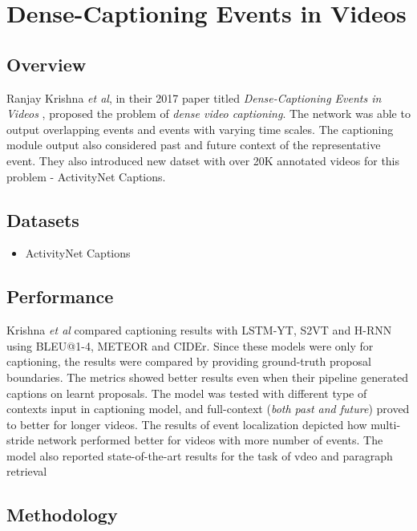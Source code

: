 \section{Dense-Captioning Events in Videos}

\subsection{Overview}

\par Ranjay Krishna \textit{et al}, in their 2017 paper titled \textit{Dense-Captioning Events in Videos} \cite{krishna2017densecaptioning}, proposed the problem of \textit{dense video captioning}. The network was able to output overlapping events and events with varying time scales. The captioning module output also considered past and future context of the representative event. They also introduced new datset with over 20K annotated videos for this problem - ActivityNet Captions.


\subsection{Datasets}
\begin{itemize}
\item ActivityNet Captions
\end{itemize}

\subsection{Performance}
\par Krishna \textit{et al} compared captioning results with LSTM-YT\cite{venugopalan2015sequence}, S2VT\cite{venugopalan2015translating} and H-RNN\cite{yu2016video} using BLEU@1-4, METEOR and CIDEr. Since these models were only for captioning, the results were compared by providing ground-truth proposal boundaries. The metrics showed better results even when their pipeline generated captions on learnt proposals. The model was tested with different type of contexts input in captioning model, and full-context (\textit{both past and future}) proved to better for longer videos. The results of event localization depicted how multi-stride network performed better for videos with more number of events. The model also reported state-of-the-art results for the task of vdeo and paragraph retrieval


\subsection{Methodology}

